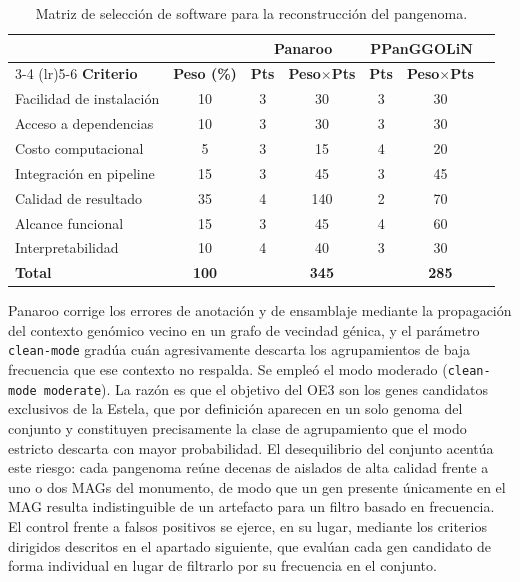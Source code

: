 \begin{table}[H]
\centering
\footnotesize
\caption{Matriz de selección de software para la reconstrucción del pangenoma.}
\label{tab:seleccion_pangenoma}
\begin{tabular}{@{}lcccccc@{}}
\toprule
& & \multicolumn{2}{c}{\textbf{Panaroo}} & \multicolumn{2}{c}{\textbf{PPanGGOLiN}} \\
\cmidrule(lr){3-4} \cmidrule(lr){5-6}
\textbf{Criterio} & \textbf{Peso (\%)} & \textbf{Pts} & \textbf{Peso$\times$Pts} & \textbf{Pts} & \textbf{Peso$\times$Pts} \\
\midrule
Facilidad de instalación & 10 & 3 & 30  & 3 & 30 \\
Acceso a dependencias    & 10 & 3 & 30  & 3 & 30 \\
Costo computacional      & 5  & 3 & 15  & 4 & 20 \\
Integración en pipeline  & 15 & 3 & 45  & 3 & 45 \\
Calidad de resultado     & 35 & 4 & 140 & 2 & 70 \\
Alcance funcional        & 15 & 3 & 45  & 4 & 60 \\
Interpretabilidad        & 10 & 4 & 40  & 3 & 30 \\
\midrule
\textbf{Total} & \textbf{100} & & \textbf{345} & & \textbf{285} \\
\bottomrule
\end{tabular}
\end{table}

Panaroo corrige los errores de anotación y de ensamblaje mediante la propagación del contexto genómico vecino en un grafo de vecindad génica, y el parámetro \texttt{clean-mode} gradúa cuán agresivamente descarta los agrupamientos de baja frecuencia que ese contexto no respalda. Se empleó el modo moderado (\texttt{clean-mode moderate}). La razón es que el objetivo del OE3 son los genes candidatos exclusivos de la Estela, que por definición aparecen en un solo genoma del conjunto y constituyen precisamente la clase de agrupamiento que el modo estricto descarta con mayor probabilidad. El desequilibrio del conjunto acentúa este riesgo: cada pangenoma reúne decenas de aislados de alta calidad frente a uno o dos MAGs del monumento, de modo que un gen presente únicamente en el MAG resulta indistinguible de un artefacto para un filtro basado en frecuencia. El control frente a falsos positivos se ejerce, en su lugar, mediante los criterios dirigidos descritos en el apartado siguiente, que evalúan cada gen candidato de forma individual en lugar de filtrarlo por su frecuencia en el conjunto.

